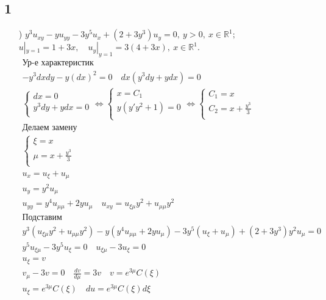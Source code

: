 \subsection{1}
\begin{enumerate}
  \item[\text{а})] $y^{3}u_{xy}-yu_{yy}-3y^{5}u_{x}+(2+3y^{3})u_{y}=0, \ y>0,\ x \in \mathbb{R}^{1};$\\
$u|_{y=1}=1+3x, \quad u_{y}|_{y=1}=3(4+3x),\ x \in \mathbb{R}^{1}.$
\begin{gather*}
  \text{Ур-е характеристик} \\
  -y^{3}dxdy-y(dx)^{2}=0 \quad dx(y^{3}dy+ydx)=0 \\
  \begin{cases}
   dx = 0 \\ y^{3}dy+ydx=0 \\ 
  \end{cases} \Leftrightarrow 
  \begin{cases}
   x = C_{1} \\ y(y'y^{2}+1)=0 \\ 
  \end{cases}\Leftrightarrow 
  \begin{cases}
   C_{1} = x \\ C_{2}=x+ \frac{y^{3}}{3} \\ 
  \end{cases} \\
  \text{Делаем замену} \\
  \begin{cases}
    \xi = x \\ \mu = x + \frac{y^{3}}{3}\\
  \end{cases} \\
  u_{x}=u_{\xi}+u_{\mu} \\ u_{y}=y^{2}u_{\mu} \\
  u_{yy}=y^{4}u_{\mu \mu}+2yu_{\mu} \quad u_{xy}=u_{\xi \mu}y^{2}+u_{\mu \mu}y^{2} \\
  \text{Подставим} \\
  y^{3}(u_{\xi \mu}y^{2}+u_{\mu \mu}y^{2})-y(y^{4}u_{\mu \mu}+2yu_{\mu})-3y^{5}(u_{\xi}+u_{\mu})+
  (2+3y^{3})y^{2}u_{\mu} = 0\\
  y^{5}u_{\xi \mu}-3y^{5}u_{\xi}=0 \quad u_{\xi \mu}-3u_{\xi}=0\\
  u_{\xi}=v \\
  v_{\mu}-3v=0 \quad \frac{dv}{d\mu}=3v \quad v = e^{3\mu}C(\xi) \\
  u_{\xi}=e^{3\mu}C(\xi) \quad du =e^{3\mu}C(\xi)d\xi \\ 

\end{gather*}
\end{enumerate}
